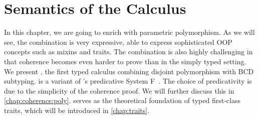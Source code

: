 
\chapter{Semantics of the \fnamee Calculus}

In this chapter, we are going to enrich \namee with parametric polymorphism. As
we will see, the combination is very expressive, able to express sophisticated
OOP concepts such as mixins and traits. The combination is also highly
challenging in that coherence becomes even harder to prove than in the simply
typed setting. We present \fnamee, the first typed calculus combining disjoint
polymorphism with BCD subtyping. \fnamee is a variant of
\citeauthor{leivant1991finitely}'s predicative System
F~\citep{leivant1991finitely}. The choice of predicativity is due to the
simplicity of the coherence proof. We will further discuss this in
\cref{chap:coherence:poly}. \fnamee serves as the theoretical foundation of
typed first-class traits, which will be introduced in \cref{chap:traits}.












